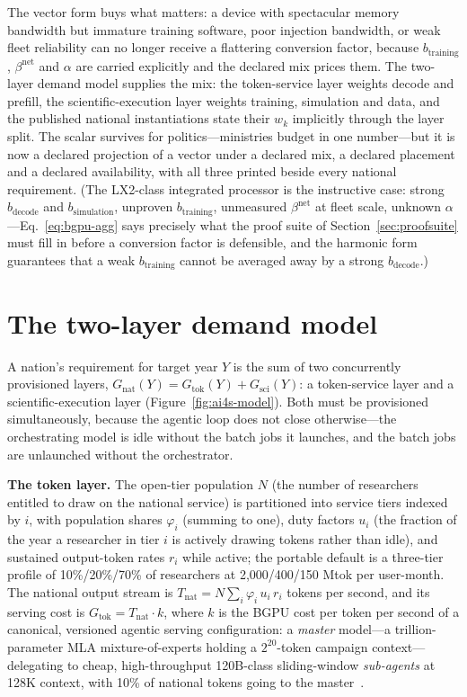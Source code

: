 The vector form buys what matters: a device with spectacular memory bandwidth but immature training software, poor injection bandwidth, or weak fleet reliability can no longer receive a flattering conversion factor, because $b_{\mathrm{training}}$, $\beta^{\mathrm{net}}$ and $\alpha$ are carried explicitly and the declared mix prices them. The two-layer demand model supplies the mix: the token-service layer weights decode and prefill, the scientific-execution layer weights training, simulation and data, and the published national instantiations state their $w_k$ implicitly through the layer split. The scalar survives for politics---ministries budget in one number---but it is now a declared projection of a vector under a declared mix, a declared placement and a declared availability, with all three printed beside every national requirement. (The LX2-class integrated processor is the instructive case: strong $b_{\mathrm{decode}}$ and $b_{\mathrm{simulation}}$, unproven $b_{\mathrm{training}}$, unmeasured $\beta^{\mathrm{net}}$ at fleet scale, unknown $\alpha$---Eq.~\eqref{eq:bgpu-agg} says precisely what the proof suite of Section~\ref{sec:proofsuite} must fill in before a conversion factor is defensible, and the harmonic form guarantees that a weak $b_{\mathrm{training}}$ cannot be averaged away by a strong $b_{\mathrm{decode}}$.)

\section{The two-layer demand model}
\label{sec:twolayer}

A nation's requirement for target year $Y$ is the sum of two concurrently provisioned layers, $G_{\mathrm{nat}}(Y) = G_{\mathrm{tok}}(Y) + G_{\mathrm{sci}}(Y)$: a token-service layer and a scientific-execution layer (Figure~\ref{fig:ai4s-model}). Both must be provisioned simultaneously, because the agentic loop does not close otherwise---the orchestrating model is idle without the batch jobs it launches, and the batch jobs are unlaunched without the orchestrator.



\textbf{The token layer.} The open-tier population $N$ (the number of researchers entitled to draw on the national service) is partitioned into service tiers indexed by $i$, with population shares $\varphi_i$ (summing to one), duty factors $u_i$ (the fraction of the year a researcher in tier $i$ is actively drawing tokens rather than idle), and sustained output-token rates $r_i$ while active; the portable default is a three-tier profile of 10\%/20\%/70\% of researchers at 2,000/400/150 Mtok per user-month. The national output stream is $T_{\mathrm{nat}} = N\sum_i \varphi_i\, u_i\, r_i$ tokens per second, and its serving cost is $G_{\mathrm{tok}} = T_{\mathrm{nat}}\cdot k$, where $k$ is the BGPU cost per token per second of a canonical, versioned agentic serving configuration: a \emph{master} model---a trillion-parameter MLA mixture-of-experts holding a $2^{20}$-token campaign context---delegating to cheap, high-throughput 120B-class sliding-window \emph{sub-agents} at 128K context, with 10\% of national tokens going to the master~\cite{ai4s-framework}.

